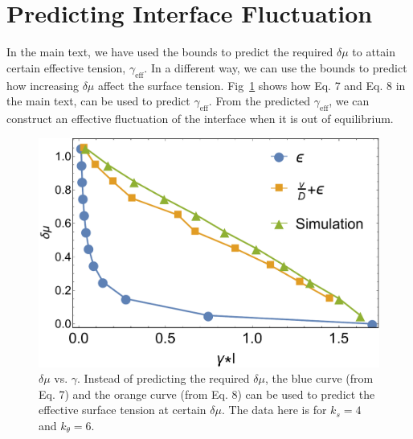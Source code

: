\documentclass[amsmath,preprintnumbers,10pt,nofootinbib,prl,twocolumn]{revtex4-1}
\begin{document}
\section{Predicting Interface Fluctuation}

In the main text, we have used the bounds to predict the required $\delta \mu$ to attain certain effective tension, $\gamma_{\textrm{eff}}$. In a different way, we can use the bounds to predict how increasing $\delta \mu$ affect the surface tension. Fig~\ref{fig:epsilonpredict} shows how Eq. 7 and Eq. 8 in the main text, can be used to predict $\gamma_{\textrm{eff}}$. From the predicted $\gamma_{\textrm{eff}}$, we can construct an effective fluctuation of the interface when it is out of equilibrium. 
\begin{figure}[tbb]
\centering
\includegraphics[scale=0.35]{predictepsilonv2.pdf}
\caption{$\delta\mu$ vs. $\gamma$. Instead of predicting the required $\delta\mu$, the blue curve (from Eq. 7) and the orange curve (from Eq. 8) can be used to predict the effective surface tension at certain $\delta \mu$. The data here is for $k_s=4$ and $k_\theta = 6$.} \label{fig:epsilonpredict}
\end{figure}
%



\end{document}

